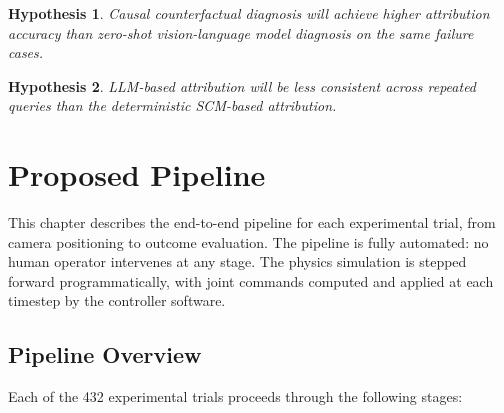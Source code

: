 \documentclass[11pt,a4paper]{report}
\newtheorem{hypothesis}{Hypothesis}[chapter]
\begin{document}
\begin{hypothesis}
  Causal counterfactual diagnosis will achieve higher attribution accuracy than zero-shot vision-language model diagnosis on the same failure cases.
  \label{hyp:comparison}
\end{hypothesis}

\begin{hypothesis}
  LLM-based attribution will be less consistent across repeated queries than the deterministic SCM-based attribution.
  \label{hyp:consistency}
\end{hypothesis}


\chapter{Proposed Pipeline}
\label{ch:method}

This chapter describes the end-to-end pipeline for each experimental trial, from camera positioning to outcome evaluation. The pipeline is fully automated: no human operator intervenes at any stage. The physics simulation is stepped forward programmatically, with joint commands computed and applied at each timestep by the controller software.

\section{Pipeline Overview}
\label{sec:pipeline_overview}

Each of the 432 experimental trials proceeds through the following stages:
\end{document}
